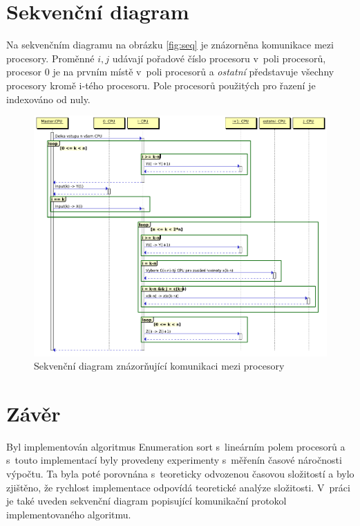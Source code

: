 \documentclass[a4paper, 12pt]{article}
\begin{document}
\section{Sekvenční diagram}
\label{sec:seq}
Na sekvenčním diagramu na obrázku \ref{fig:seq} je znázorněna komunikace mezi procesory.
Proměnné $i,j$ udávají pořadové číslo procesoru v~poli procesorů,
procesor $0$ je na prvním místě v~poli procesorů
a \emph{ostatní} představuje všechny procesory kromě i-tého procesoru.
Pole procesorů použitých pro řazení je indexováno od nuly.
\begin{figure}
\includegraphics[scale=0.7]{seq.png}
\caption{Sekvenční diagram znázorňující komunikaci mezi procesory}
\end{figure}
\label{fig:seq}

\section{Závěr}
Byl implementován algoritmus Enumeration sort s~lineárním polem procesorů a s~touto implementací byly provedeny
experimenty s~měřenín časové náročnosti výpočtu. Ta byla poté porovnána s~teoreticky odvozenou časovou složitostí a
bylo zjištěno, že rychlost implementace odpovídá teoretické analýze složitosti.
V~práci je také uveden sekvenční diagram popisující komunikační protokol implementovaného algoritmu.
\end{document}
